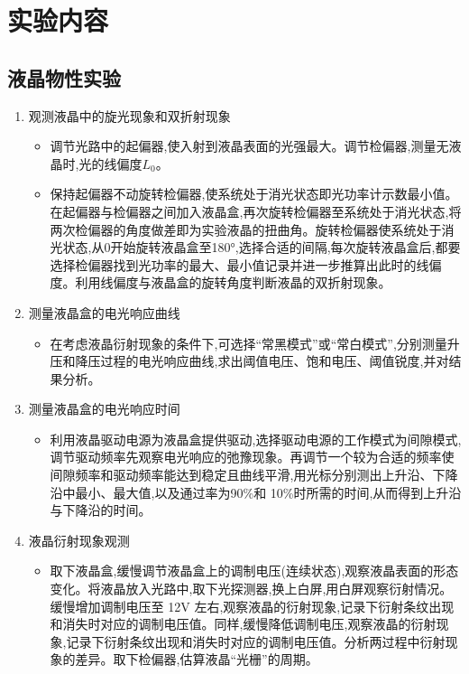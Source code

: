 \documentclass[12pt, a4paper]{article}
\begin{document}
\section{实验内容}

\subsection{液晶物性实验}
\begin{enumerate}
    \item 观测液晶中的旋光现象和双折射现象
    \begin{itemize}
        \item 调节光路中的起偏器,使入射到液晶表面的光强最大。调节检偏器,测量无液晶时,光的线偏度$L_0$。
        \item 保持起偏器不动旋转检偏器,使系统处于消光状态即光功率计示数最小值。在起偏器与检偏器之间加入液晶盒,再次旋转检偏器至系统处于消光状态,将两次检偏器的角度做差即为实验液晶的扭曲角。旋转检偏器使系统处于消光状态,从0开始旋转液晶盒至180°,选择合适的间隔,每次旋转液晶盒后,都要选择检偏器找到光功率的最大、最小值记录并进一步推算出此时的线偏度。利用线偏度与液晶盒的旋转角度判断液晶的双折射现象。
    \end{itemize}

    \item 测量液晶盒的电光响应曲线
    \begin{itemize}
        \item 在考虑液晶衍射现象的条件下,可选择“常黑模式”或“常白模式”,分别测量升压和降压过程的电光响应曲线,求出阈值电压、饱和电压、阈值锐度,并对结果分析。
    \end{itemize}
    
    \item 测量液晶盒的电光响应时间
    \begin{itemize}
        \item 利用液晶驱动电源为液晶盒提供驱动,选择驱动电源的工作模式为间隙模式,调节驱动频率先观察电光响应的弛豫现象。再调节一个较为合适的频率使间隙频率和驱动频率能达到稳定且曲线平滑,用光标分别测出上升沿、下降沿中最小、最大值,以及通过率为90\%和 10\%时所需的时间,从而得到上升沿与下降沿的时间。
    \end{itemize}
    
    \item 液晶衍射现象观测
     \begin{itemize}
         \item 取下液晶盒,缓慢调节液晶盒上的调制电压(连续状态),观察液晶表面的形态变化。将液晶放入光路中,取下光探测器,换上白屏,用白屏观察衍射情况。缓慢增加调制电压至 12V 左右,观察液晶的衍射现象,记录下衍射条纹出现和消失时对应的调制电压值。同样,缓慢降低调制电压,观察液晶的衍射现象,记录下衍射条纹出现和消失时对应的调制电压值。分析两过程中衍射现象的差异。取下检偏器,估算液晶“光栅”的周期。
     \end{itemize}
\end{enumerate}
\end{document}
